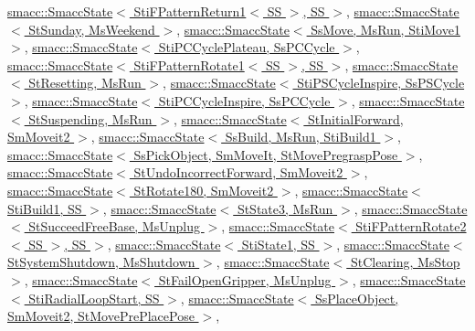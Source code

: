 \hyperlink{classsmacc_1_1SmaccState_afc39f8e0ca4001b2159a100da2fccd0e}{smacc\+::\+Smacc\+State$<$ Sti\+F\+Pattern\+Return1$<$ S\+S $>$, S\+S $>$}, \hyperlink{classsmacc_1_1SmaccState_afc39f8e0ca4001b2159a100da2fccd0e}{smacc\+::\+Smacc\+State$<$ St\+Sunday, Ms\+Weekend $>$}, \hyperlink{classsmacc_1_1SmaccState_afc39f8e0ca4001b2159a100da2fccd0e}{smacc\+::\+Smacc\+State$<$ Ss\+Move, Ms\+Run, Sti\+Move1 $>$}, \hyperlink{classsmacc_1_1SmaccState_afc39f8e0ca4001b2159a100da2fccd0e}{smacc\+::\+Smacc\+State$<$ Sti\+P\+C\+Cycle\+Plateau, Ss\+P\+C\+Cycle $>$}, \hyperlink{classsmacc_1_1SmaccState_afc39f8e0ca4001b2159a100da2fccd0e}{smacc\+::\+Smacc\+State$<$ Sti\+F\+Pattern\+Rotate1$<$ S\+S $>$, S\+S $>$}, \hyperlink{classsmacc_1_1SmaccState_afc39f8e0ca4001b2159a100da2fccd0e}{smacc\+::\+Smacc\+State$<$ St\+Resetting, Ms\+Run $>$}, \hyperlink{classsmacc_1_1SmaccState_afc39f8e0ca4001b2159a100da2fccd0e}{smacc\+::\+Smacc\+State$<$ Sti\+P\+S\+Cycle\+Inspire, Ss\+P\+S\+Cycle $>$}, \hyperlink{classsmacc_1_1SmaccState_afc39f8e0ca4001b2159a100da2fccd0e}{smacc\+::\+Smacc\+State$<$ Sti\+P\+C\+Cycle\+Inspire, Ss\+P\+C\+Cycle $>$}, \hyperlink{classsmacc_1_1SmaccState_afc39f8e0ca4001b2159a100da2fccd0e}{smacc\+::\+Smacc\+State$<$ St\+Suspending, Ms\+Run $>$}, \hyperlink{classsmacc_1_1SmaccState_afc39f8e0ca4001b2159a100da2fccd0e}{smacc\+::\+Smacc\+State$<$ St\+Initial\+Forward, Sm\+Moveit2 $>$}, \hyperlink{classsmacc_1_1SmaccState_afc39f8e0ca4001b2159a100da2fccd0e}{smacc\+::\+Smacc\+State$<$ Ss\+Build, Ms\+Run, Sti\+Build1 $>$}, \hyperlink{classsmacc_1_1SmaccState_afc39f8e0ca4001b2159a100da2fccd0e}{smacc\+::\+Smacc\+State$<$ Ss\+Pick\+Object, Sm\+Move\+It, St\+Move\+Pregrasp\+Pose $>$}, \hyperlink{classsmacc_1_1SmaccState_afc39f8e0ca4001b2159a100da2fccd0e}{smacc\+::\+Smacc\+State$<$ St\+Undo\+Incorrect\+Forward, Sm\+Moveit2 $>$}, \hyperlink{classsmacc_1_1SmaccState_afc39f8e0ca4001b2159a100da2fccd0e}{smacc\+::\+Smacc\+State$<$ St\+Rotate180, Sm\+Moveit2 $>$}, \hyperlink{classsmacc_1_1SmaccState_afc39f8e0ca4001b2159a100da2fccd0e}{smacc\+::\+Smacc\+State$<$ Sti\+Build1, S\+S $>$}, \hyperlink{classsmacc_1_1SmaccState_afc39f8e0ca4001b2159a100da2fccd0e}{smacc\+::\+Smacc\+State$<$ St\+State3, Ms\+Run $>$}, \hyperlink{classsmacc_1_1SmaccState_afc39f8e0ca4001b2159a100da2fccd0e}{smacc\+::\+Smacc\+State$<$ St\+Succeed\+Free\+Base, Ms\+Unplug $>$}, \hyperlink{classsmacc_1_1SmaccState_afc39f8e0ca4001b2159a100da2fccd0e}{smacc\+::\+Smacc\+State$<$ Sti\+F\+Pattern\+Rotate2$<$ S\+S $>$, S\+S $>$}, \hyperlink{classsmacc_1_1SmaccState_afc39f8e0ca4001b2159a100da2fccd0e}{smacc\+::\+Smacc\+State$<$ Sti\+State1, S\+S $>$}, \hyperlink{classsmacc_1_1SmaccState_afc39f8e0ca4001b2159a100da2fccd0e}{smacc\+::\+Smacc\+State$<$ St\+System\+Shutdown, Ms\+Shutdown $>$}, \hyperlink{classsmacc_1_1SmaccState_afc39f8e0ca4001b2159a100da2fccd0e}{smacc\+::\+Smacc\+State$<$ St\+Clearing, Ms\+Stop $>$}, \hyperlink{classsmacc_1_1SmaccState_afc39f8e0ca4001b2159a100da2fccd0e}{smacc\+::\+Smacc\+State$<$ St\+Fail\+Open\+Gripper, Ms\+Unplug $>$}, \hyperlink{classsmacc_1_1SmaccState_afc39f8e0ca4001b2159a100da2fccd0e}{smacc\+::\+Smacc\+State$<$ Sti\+Radial\+Loop\+Start, S\+S $>$}, \hyperlink{classsmacc_1_1SmaccState_afc39f8e0ca4001b2159a100da2fccd0e}{smacc\+::\+Smacc\+State$<$ Ss\+Place\+Object, Sm\+Moveit2, St\+Move\+Pre\+Place\+Pose $>$}, 